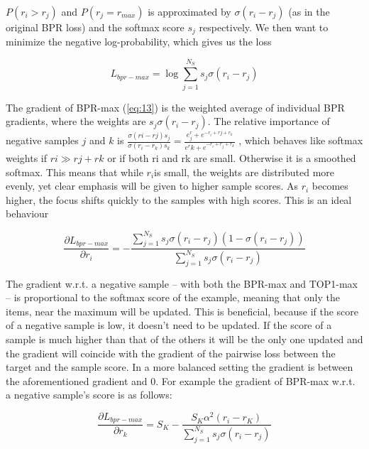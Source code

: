 $P(r_i > r_j )$ and $P(r_j = r_{max})$ is approximated by $\sigma(r_i − r_j )$ (as in the original BPR loss) and the
softmax score $s_j$ respectively. We then want to minimize the negative log-probability, which gives
us the loss

\begin{equation}\label{eq:12}
  L_{bpr-max} = \log \sum_{j=1}^{N_S} s_j \sigma (r_i - r_j)
  \end{equation}


The gradient of BPR-max (\ref{eq:13}) is the weighted average of individual BPR gradients, where the
weights are $s_j \sigma (r_i − r_j)$. The relative importance of negative samples $j$ and $k$ is 
$\frac{\sigma(ri−rj )s_j} {\sigma(r_i−r_k)s_k} = \frac{e^r_j + e^{-r_i+rj+r_k}}{e^rk + e^{-r_i+r_j+r_k}} $
, which behaves like softmax weights if $ri \gg rj + rk$ or if both ri and rk are small.
Otherwise it is a smoothed softmax. This means that while $r_i$is small, the weights are distributed
more evenly, yet clear emphasis will be given to higher sample scores. As $r_i$ becomes higher, the
focus shifts quickly to the samples with high scores. This is an ideal behaviour

\begin{equation}\label{eq:13}
  \frac{\partial L_{bpr-max}} {\partial r_i} = - \frac{\sum_{j=1}^{N_S} s_j \sigma(r_i - r_j)(1-\sigma (r_i - r_j))} {\sum_{j=1}^{N_S} s_j \sigma (r_i - r_j)}
\end{equation}

The gradient w.r.t. a negative sample – with both the BPR-max and TOP1-max – is proportional to the softmax score of the example, meaning that only the items, near the maximum will be updated. This is beneficial, because if the score of a negative sample is low, it doesn’t need to be updated. If the score of a sample is much higher than that of the others it will be the only one updated and the gradient will coincide with the gradient of the pairwise loss between the target and the sample score. In a more balanced setting the gradient is between the aforementioned gradient and 0. For example the gradient of BPR-max w.r.t. a negative sample’s score is as follows:


\begin{equation}\label{eq:14}
  \frac{\partial L_{bpr-max}} {\partial r_k} = S_K - \frac{S_K \alpha^2 (r_i - r_K)} {\sum_{j=1}^{N_S} s_j \sigma (r_i - r_j)}
\end{equation}


